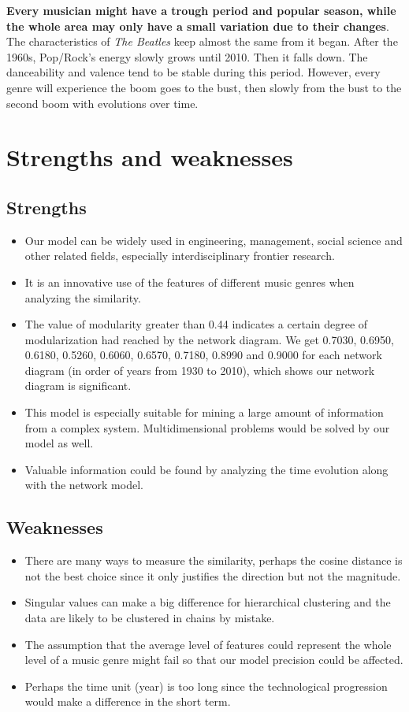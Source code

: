 \documentclass[12pt]{article}
\begin{document}
\textbf{Every musician might have a trough period and popular season, while the whole area may only have a small variation due to their changes}. The characteristics of \emph{The Beatles} keep almost the same from it began. After the 1960s, Pop/Rock’s energy slowly grows until 2010. Then it falls down. The danceability and valence tend to be stable during this period. However, every genre will experience the boom goes to the bust, then slowly from the bust to the second boom with evolutions over time.

\section{Strengths and weaknesses}
\subsection{Strengths}
\begin{itemize}
    \item Our model can be widely used in engineering, management, social science and other related fields, especially interdisciplinary frontier research.
    \item It is an innovative use of the features of different music genres when analyzing the similarity.
    \item The value of modularity greater than 0.44 indicates a certain degree of modularization had reached by the network diagram. We get 0.7030, 0.6950, 0.6180, 0.5260, 0.6060, 0.6570, 0.7180, 0.8990 and 0.9000 for each network diagram (in order of years from 1930 to 2010), which shows our network diagram is significant.
    \item This model is especially suitable for mining a large amount of information from a complex system. Multidimensional problems would be solved by our model as well.
    \item Valuable information could be found by analyzing the time evolution along with the network model.
\end{itemize}
\subsection{Weaknesses}
\begin{itemize}
    \item There are many ways to measure the similarity, perhaps the cosine distance is not the best choice since it only justifies the direction but not the magnitude.
    \item Singular values can make a big difference for hierarchical clustering and the data are likely to be clustered in chains by mistake.
    \item The assumption that the average level of features could represent the whole level of a music genre might fail so that our model precision could be affected.
    \item Perhaps the time unit (year) is too long since the technological progression would make a difference in the short term.
\end{itemize}
\end{document}
